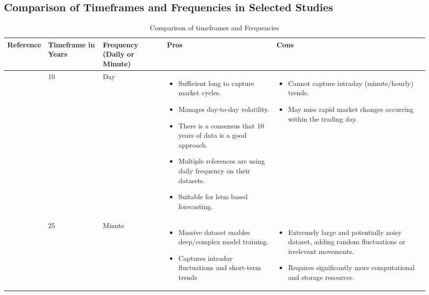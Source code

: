 \clearpage

\begin{landscape}

\subsection{Comparison of Timeframes and Frequencies in Selected Studies}
\label{app:timeframes}

\begin{table}[h]
    \centering
    \caption{Comparison of timeframes and Frequencies}
    \label{tab:timeframes}
    \begin{tabular}{p{3.5cm}p{2cm}p{2cm}p{7.5cm}p{7.5cm}}
        \hline
        \textbf{Reference} & \textbf{Timeframe in Years} & 
        \textbf{Frequency (Daily or Minute)} & \textbf{Pros} & \textbf{Cons} \\
        \hline\hline
        
        \parencite{nabipour2020DeepLearning} 
        \parencite{chang2024StockPrediction} 
        \parencite{balasubramanian2023SystematicSurvey} 
        \parencite{phuoc2024StockPrediction} 
        & 10 
        & Day  
        & \begin{itemize}
            \item Sufficient long to capture market cycles.
            \item Manages day-to-day volatility.
             \item There is a consensus that 10 years of data is a good approach.
            \item Multiple references are using daily frequency on their datasets.
            \item Suitable for \acrshort{lstm} based forecasting.
        \end{itemize}
        & \begin{itemize}
            \item Cannot capture intraday (minute/hourly) trends.
            \item May miss rapid market changes occurring within the trading day.
        \end{itemize}
        \\

        \parencite{guo2024LSTMStock} 
        & 25 
        & Minute  
        & \begin{itemize}
            \item Massive dataset enables deep/complex model training.
            \item Captures intraday fluctuations and short-term trends
        \end{itemize}
        & \begin{itemize}
            \item Extremely large and potentially noisy dataset, adding random
            fluctuations or irrelevant movements.
            \item Requires significantly more computational and storage resources.
        \end{itemize}
        \\
        \hline
    \end{tabular}
\end{table}

\fillandplacepagenumber
\end{landscape}
